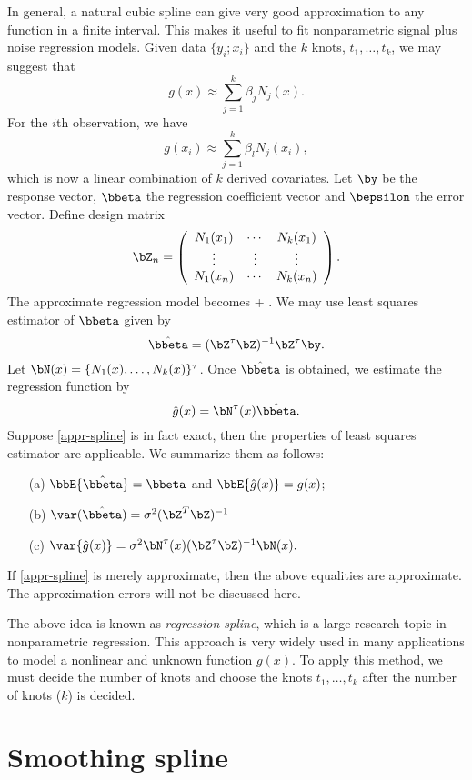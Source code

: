 \vs\vs
In general, a natural cubic spline can give very good
approximation to any function in a finite interval. 
This makes it useful to fit nonparametric 
signal plus noise regression models.
Given data $\{y_i;x_i\}$ and the $k$ knots, $t_1, \ldots, t_k$, 
we may suggest that
\[
g(x) \approx \sum_{j =1}^{k}\beta_j N_j(x). 
\]
For the $i$th observation, we have
\[
g(x_i)
\approx \sum_{j=1}^{k} \beta_l N_j(x_i),
\]
which is now a linear combination of $k$ derived covariates. 
Let $\by$ be the response vector, 
$\bbeta$ the regression coefficient vector and
$\bepsilon$ the error vector.
Define design matrix
\[
\bZ_n 
=\left(
 \begin{array}{ccc}
 N_{1}(x_1) & \cdots & N_{k}(x_1)\\
 \vdots&\vdots&\vdots\\
 N_{1}(x_n) & \cdots & N_{k}(x_n)\\
 \end{array}
 \right).
\]
The approximate regression model becomes
\be
\label{appr-spline}
 \by
 \approx
 \bZ \bbeta + \bepsilon.
\ee
We may use least squares estimator of $\bbeta$
given by
\[
 \hat\bbeta=(\bZ^\tau\bZ)^{-1}\bZ^\tau \by. 
\]
Let $\bN(x) = \{N_1(x), \ldots, N_k(x)\}^\tau$.
Once $\hat\bbeta$ is obtained, 
we estimate the regression function by
\[
 \hat g(x) = \bN^\tau(x) \hat \bbeta.
\]
Suppose \eqref{appr-spline} is in fact exact, then the
properties of least squares estimator are applicable. 
We summarize them as follows: 
\begin{enumerate}
\item[(a)] 
$\bbE \{\hat \bbeta\} = \bbeta$ and $\bbE\{\hat g(x)\} = g(x)$; 
\item[(b)] 
$\var(\hat \bbeta) = \sigma^2(\bZ^T\bZ)^{-1}$ 
\item[(c)]
$
\var\{\hat g(x)\} =\sigma^2 \bN^\tau (x) (\bZ^\tau \bZ)^{-1} \bN(x).
$
\end{enumerate} 

If \eqref{appr-spline} is merely approximate, then 
the above equalities are approximate.
The approximation errors will not be discussed here.

The above idea is known as {\it regression spline}, 
which is a large research topic in nonparametric regression. 
This approach is very widely used in many applications
to model a nonlinear and unknown function $g(x)$. 
To apply this method, we must decide the number of knots
and choose the knots $t_1,\ldots, t_k$ after the number of knots ($k$)
is decided. 
 
 \section{Smoothing spline}
 
